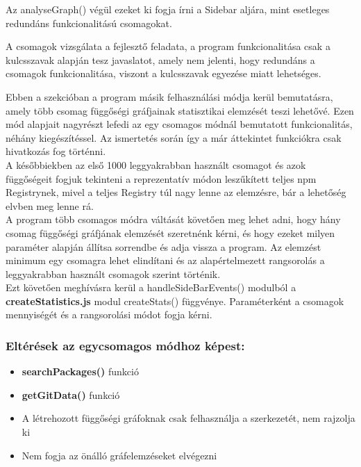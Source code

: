 Az analyseGraph() végül ezeket ki fogja írni a Sidebar aljára, mint esetleges redundáns funkcionalitású csomagokat.

A csomagok vizsgálata a fejlesztő feladata, a program funkcionalitása csak a kulcsszavak alapján tesz javaslatot, amely nem jelenti, hogy redundáns a csomagok funkcionalitása, viszont a kulcsszavak egyezése miatt lehetséges.

\pagebreak 


Ebben a szekcióban a program másik felhasználási módja kerül bemutatásra, amely több csomag függőségi gráfjainak statisztikai elemzését teszi lehetővé.
Ezen mód alapjait nagyrészt lefedi az egy csomagos módnál bemutatott funkcionalitás, néhány kiegészítéssel. Az ismertetés során így a már áttekintet funkciókra csak hivatkozás fog történni.\\
 
A későbbiekben az első 1000 leggyakrabban használt csomagot és azok függőségeit fogjuk tekinteni a reprezentatív módon leszűkített teljes npm Registrynek, mivel a teljes Registry túl nagy lenne az elemzésre, bár a lehetőség elvben meg lenne rá.\\

A program több csomagos módra váltását követően meg lehet adni, hogy hány csomag függőségi gráfjának elemzését szeretnénk kérni, és hogy ezeket milyen paraméter alapján állítsa sorrendbe és adja vissza a program. Az elemzést minimum egy csomagra lehet elindítani és az alapértelmezett rangsorolás a leggyakrabban használt csomagok szerint történik.\\

Ezt követően meghívásra kerül a handleSideBarEvents() modulból a \textbf{createStatistics.js} modul createStats() függvénye. Paraméterként a csomagok mennyiségét és a rangsorolási módot fogja kérni.

\subsubsection{Eltérések az egycsomagos módhoz képest:}

\begin{itemize}
	\item \textbf{searchPackages()} funkció
	\item \textbf{getGitData()} funkció
	\item A létrehozott függőségi gráfoknak csak felhasználja a szerkezetét, nem rajzolja ki
	\item Nem fogja az önálló gráfelemzéseket elvégezni
\end{itemize}

